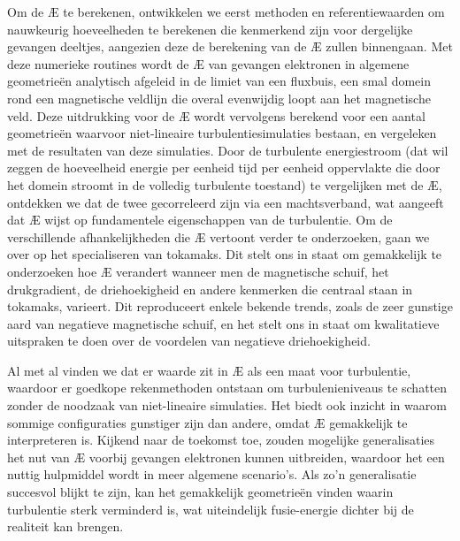 Om de \AE{} te berekenen, ontwikkelen we eerst methoden en referentiewaarden om nauwkeurig hoeveelheden te berekenen die kenmerkend zijn voor dergelijke gevangen deeltjes, aangezien deze de berekening van de \AE{} zullen binnengaan. Met deze numerieke routines wordt de \AE{} van gevangen elektronen in algemene geometrieën analytisch afgeleid in de limiet van een fluxbuis, een smal domein rond een magnetische veldlijn die overal evenwijdig loopt aan het magnetische veld. Deze uitdrukking voor de \AE{} wordt vervolgens berekend voor een aantal geometrieën waarvoor niet-lineaire turbulentiesimulaties bestaan, en vergeleken met de resultaten van deze simulaties. Door de turbulente energiestroom (dat wil zeggen de hoeveelheid energie per eenheid tijd per eenheid oppervlakte die door het domein stroomt in de volledig turbulente toestand) te vergelijken met de \AE{}, ontdekken we dat de twee gecorreleerd zijn via een machtsverband, wat aangeeft dat \AE{} wijst op fundamentele eigenschappen van de turbulentie. Om de verschillende afhankelijkheden die \AE{} vertoont verder te onderzoeken, gaan we over op het specialiseren van tokamaks. Dit stelt ons in staat om gemakkelijk te onderzoeken hoe \AE{} verandert wanneer men de magnetische schuif, het drukgradient, de driehoekigheid en andere kenmerken die centraal staan in tokamaks, varieert. Dit reproduceert enkele bekende trends, zoals de zeer gunstige aard van negatieve magnetische schuif, en het stelt ons in staat om kwalitatieve uitspraken te doen over de voordelen van negatieve driehoekigheid. \par
Al met al vinden we dat er waarde zit in \AE{} als een maat voor turbulentie, waardoor er goedkope rekenmethoden ontstaan om turbulenieniveaus te schatten zonder de noodzaak van niet-lineaire simulaties. Het biedt ook inzicht in waarom sommige configuraties gunstiger zijn dan andere, omdat \AE{} gemakkelijk te interpreteren is. Kijkend naar de toekomst toe, zouden mogelijke generalisaties het nut van \AE{} voorbij gevangen elektronen kunnen uitbreiden, waardoor het een nuttig hulpmiddel wordt in meer algemene scenario's. Als zo'n generalisatie succesvol blijkt te zijn, kan het gemakkelijk geometrieën vinden waarin turbulentie sterk verminderd is, wat uiteindelijk fusie-energie dichter bij de realiteit kan brengen.


\vspace*{11pt}\noindent


